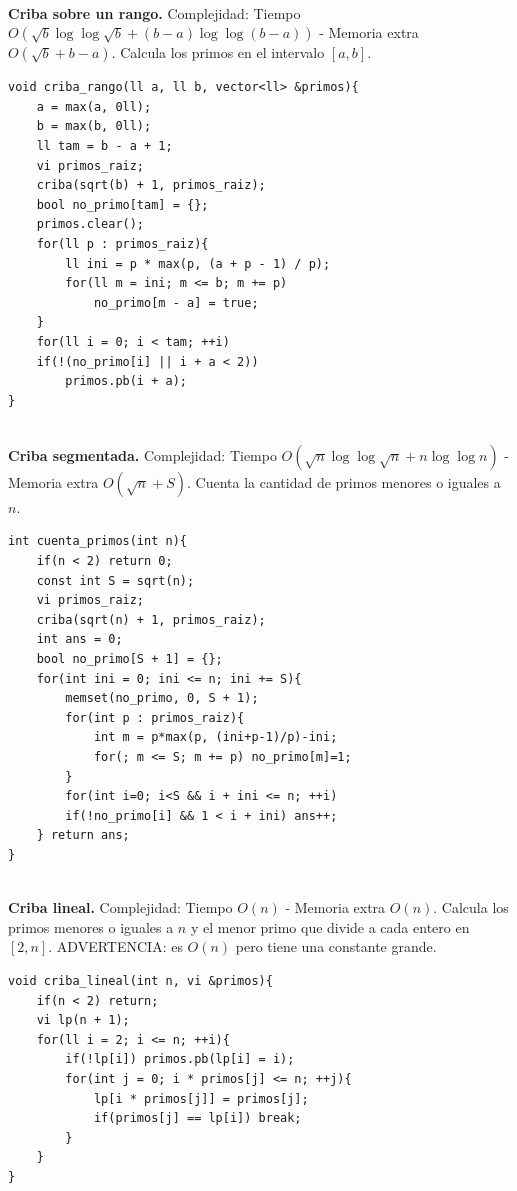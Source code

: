 \documentclass[10pt,spanish,mexico]{article}
\numberwithin{equation}{section}
\begin{document}
\begin{multicols}{2}
\vspace{-1.2\baselineskip}
\hrulefill\\
\textbf{Criba sobre un rango.} Complejidad: Tiempo $O(\sqrt{b} \log \log \sqrt{b} + (b - a)\log \log(b - a))$ - Memoria extra $O(\sqrt{b} + b - a)$. Calcula los primos en el intervalo $[a, b]$.
\begin{verbatim}
void criba_rango(ll a, ll b, vector<ll> &primos){
    a = max(a, 0ll);
    b = max(b, 0ll);
    ll tam = b - a + 1;
    vi primos_raiz;
    criba(sqrt(b) + 1, primos_raiz);
    bool no_primo[tam] = {};
    primos.clear();
    for(ll p : primos_raiz){
        ll ini = p * max(p, (a + p - 1) / p);
        for(ll m = ini; m <= b; m += p)
            no_primo[m - a] = true;
    }
    for(ll i = 0; i < tam; ++i)
    if(!(no_primo[i] || i + a < 2))
        primos.pb(i + a);
}
\end{verbatim}

\vspace{-1.2\baselineskip}
\hrulefill\\
\textbf{Criba segmentada.} Complejidad: Tiempo $O(\sqrt{n}\log \log \sqrt{n} + n\log \log n)$ - Memoria extra $O(\sqrt{n} + S)$. Cuenta la cantidad de primos menores o iguales a $n$.
\begin{verbatim}
int cuenta_primos(int n){
    if(n < 2) return 0;
    const int S = sqrt(n);
    vi primos_raiz;
    criba(sqrt(n) + 1, primos_raiz);
    int ans = 0;
    bool no_primo[S + 1] = {};
    for(int ini = 0; ini <= n; ini += S){
        memset(no_primo, 0, S + 1);
        for(int p : primos_raiz){
            int m = p*max(p, (ini+p-1)/p)-ini;
            for(; m <= S; m += p) no_primo[m]=1;
        }
        for(int i=0; i<S && i + ini <= n; ++i)
        if(!no_primo[i] && 1 < i + ini) ans++;
    } return ans;
}
\end{verbatim}

\vspace{-1.2\baselineskip}
\hrulefill\\
\textbf{Criba lineal.} Complejidad: Tiempo $O(n)$ - Memoria extra $O(n)$. Calcula los primos menores o iguales a $n$ y el menor primo que divide a cada entero en $[2, n]$. ADVERTENCIA: es $O(n)$ pero tiene una constante grande.
\begin{verbatim}
void criba_lineal(int n, vi &primos){
    if(n < 2) return;
    vi lp(n + 1);
    for(ll i = 2; i <= n; ++i){
        if(!lp[i]) primos.pb(lp[i] = i);
        for(int j = 0; i * primos[j] <= n; ++j){
            lp[i * primos[j]] = primos[j];
            if(primos[j] == lp[i]) break;
        }
    }
}
\end{verbatim}


\end{multicols}
\end{document}
